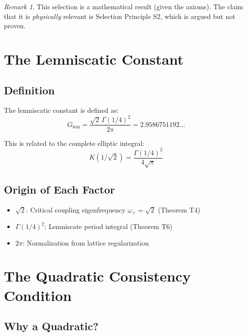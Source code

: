 \documentclass[11pt,a4paper]{article}
\theoremstyle{definition}
\theoremstyle{remark}
\newtheorem{remark}[theorem]{Remark}
\newcommand{\Glem}{G_{\text{lem}}}
\begin{document}
\begin{remark}
This selection is a mathematical result (given the axioms). The claim that it is \emph{physically} relevant is Selection Principle S2, which is argued but not proven.
\end{remark}

\section{The Lemniscatic Constant}

\subsection{Definition}

The lemniscatic constant is defined as:
\begin{equation}
    \Glem = \frac{\sqrt{2}\, \Gamma(1/4)^2}{2\pi} = 2.9586751192\ldots
\end{equation}

This is related to the complete elliptic integral:
\begin{equation}
    K(1/\sqrt{2}) = \frac{\Gamma(1/4)^2}{4\sqrt{\pi}}
\end{equation}

\subsection{Origin of Each Factor}

\begin{itemize}
    \item $\sqrt{2}$: Critical coupling eigenfrequency $\omega_+ = \sqrt{2}$ (Theorem T4)
    \item $\Gamma(1/4)^2$: Lemniscate period integral (Theorem T6)
    \item $2\pi$: Normalization from lattice regularization
\end{itemize}

\section{The Quadratic Consistency Condition}

\subsection{Why a Quadratic?}
\end{document}
